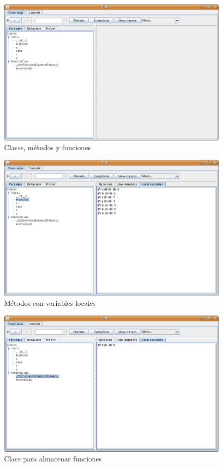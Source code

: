 \documentclass[10pt,a4paper]{article}
\begin{document}
\begin{figure}[hpb]
	\centering
	\includegraphics[scale=0.3]{images/TOD-5.eps}
	\caption{Clases, métodos y funciones}
\end{figure}

\newpage
\begin{figure}[hpb]
	\centering
	\includegraphics[scale=0.3]{images/TOD-6.eps}
	\caption{Métodos con variables locales}
\end{figure}

\begin{figure}[hpb]
	\centering
	\includegraphics[scale=0.3]{images/TOD-7.eps}
	\caption{Clase para almacenar funciones}
\end{figure}
\end{document}

